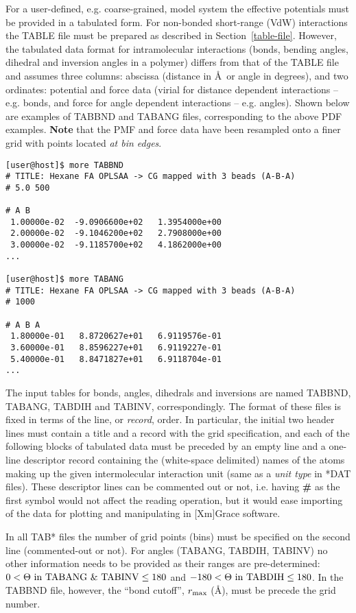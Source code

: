 For a user-defined, e.g. coarse-grained, model system
the effective potentials must be provided in a tabulated form.
For non-bonded short-range (VdW) interactions the TABLE file
must be prepared as described in Section~\ref{table-file}.
However, the tabulated data format for intramolecular
interactions (bonds, bending angles, dihedral and inversion
angles in a polymer) differs from that of the TABLE file and
assumes three columns: abscissa (distance in \AA~or angle
in degrees), and two ordinates: potential and force data
(virial for distance dependent interactions -- e.g. bonds,
and force for angle dependent interactions -- e.g. angles).
Shown below are examples of TABBND and TABANG files,
corresponding to the above PDF examples. {\bf Note} that
the PMF and force data have been resampled onto a finer grid
with points located {\em at bin edges}.

\begin{verbatim}
[user@host]$ more TABBND
# TITLE: Hexane FA OPLSAA -> CG mapped with 3 beads (A-B-A)
# 5.0 500

# A B
 1.00000e-02  -9.0906600e+02   1.3954000e+00
 2.00000e-02  -9.1046200e+02   2.7908000e+00
 3.00000e-02  -9.1185700e+02   4.1862000e+00
...

[user@host]$ more TABANG
# TITLE: Hexane FA OPLSAA -> CG mapped with 3 beads (A-B-A)
# 1000

# A B A
 1.80000e-01   8.8720627e+01   6.9119576e-01
 3.60000e-01   8.8596227e+01   6.9119227e-01
 5.40000e-01   8.8471827e+01   6.9118704e-01
...
\end{verbatim}

The input tables for bonds, angles, dihedrals and inversions are
named TABBND, TABANG, TABDIH and TABINV, correspondingly.
The format of these files is fixed in terms of the line,
or {\em record}, order.  In particular, the initial two
header lines must contain a title and a record with the grid
specification, and each of the following blocks of tabulated
data must be preceded by an empty line and a one-line
descriptor record containing the (white-space delimited) names
of the atoms making up the given intermolecular interaction
unit (same as a {\em unit type} in *DAT files).  These descriptor
lines can be commented out or not, i.e. having {\bf \#} as the
first symbol would not affect the reading operation, but it would
ease importing of the data for plotting and manipulating
in [Xm]Grace software.

In all TAB* files the number of grid points (bins) must be
specified on the second line (commented-out or not).  For
angles (TABANG, TABDIH, TABINV) no other information needs
to be provided as their ranges are pre-determined:
$0 < {\Theta\ \rm in\ TABANG\ \&\ TABINV} \le 180$
and  $-180 < {\Theta\ \rm in\ TABDIH} \le 180$. In the TABBND
file, however, the ``bond cutoff'', $r_{\rm max}$ (\AA),
must be precede the grid number.

